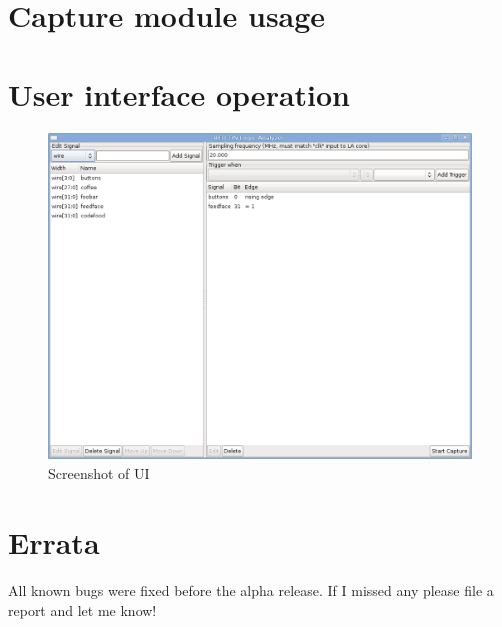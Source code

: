 \documentclass[pdftex]{article}
\begin{document}
\pagebreak
\section{Capture module usage}


\pagebreak
\section{User interface operation}

\paragraph*{}
\begin{figure}[h]
\includegraphics[scale=0.45]{gui-shot1.png}
\caption{Screenshot of UI}
\label{gui-overview}
\end{figure}

\pagebreak
\section{Errata}

\paragraph*{}
All known bugs were fixed before the alpha release. If I missed any please file a report and let me know!
\end{document}
